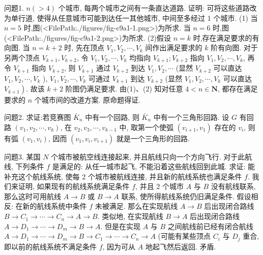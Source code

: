 
问题1. $n(>4)$ 个城市, 每两个城市之间有一条直达道路.
证明: 可将这些道路改为单行道, 使得从任意城市可能到达任一其他城市, 中间至多经过 1 个城市.
(1) 当 $n=5$ 时,图(<FilePath:./figures/fig-c9a1-1.png>)为所求.
当 $n=6$ 时,图(<FilePath:./figures/fig-c9a1-2.png>)为所求.
(2)假设 $n=k$ 时,存在满足要求的有向图.
当 $n=k+2$ 时, 先在顶点 $V_1, V_2, \cdots, V_k$ 间作出满足要求的 $k$ 阶有向图.
对于另两个顶点 $V_{k+1}, V_{k+2}$, 令 $V_1, V_2, \cdots, V_k$ 均指向 $V_{k+1} ; V_{k+2}$ 指向 $V_1, V_2, \cdots, V_k$, 再令 $V_{k+1}$ 指向 $V_{k+2}$, 则 $V_{k+1}$ 通过 $V_{k+2}$ 到达 $V_1, V_2, \cdots$ (显然 $V_{k+2}$ 可以直达 $V_1, V_2, \cdots, V_k$ ), $V_1, V_2, \cdots, V_k$ 可通过 $V_{k+1}$ 到达 $V_{k+2}$ (显然 $V_1, V_2, \cdots, V_k$ 可以直达 $\left.V_{k+1}\right)$. 故该 $k+2$ 阶图仍满足要求.
由(1)、(2) 知对任意 $4<n \in \mathbf{N}$, 都存在满足要求的 $n$ 个城市间的改道方案.
原命题得证.



问题2. 求证:若竞赛图 $\bar{K}_n$ 中有一个回路, 则 $\bar{K}_n$ 中有一个三角形回路.
设 $G$ 有回路 $\left(v_1, v_2, \cdots, v_k\right)$, 在 $v_2, v_3, \cdots, v_{k-1}$ 中, 取第一个使弧 $\left(v_{i+1}, v_1\right)$ 存在的 $v_i$, 则有弧 $\left(v_1, v_i\right)$, 因而 $\left(v_1, v_i, v_{i+1}\right)$ 就是一个三角形的回路.



问题3. 某国 $N$ 个城市被航空线连接起来, 并且航线只向一个方向飞行.
对于此航线, 下列条件 $f$ 是满足的: 从任一城市起飞, 不能沿着这些航线回到此城.
求证: 能补充这个航线系统, 使每 2 个城市被航线连接, 并且新的航线系统也满足条件 $f$.
我们来证明, 如果现有的航线系统满足条件 $f$, 并且 2 个城市 $A$ 与 $B$ 没有航线联系, 那么这时可用航线 $A \rightarrow B$ 或 $B \rightarrow A$ 联系, 使所得航线系统仍旧满足条件.
假设相反: 在新的航线系统中条件 $f$ 未被满足.
那么在实现航线 $A \rightarrow B$ 后出现闭合路线 $B \rightarrow C_1 \rightarrow \cdots \rightarrow C_n \rightarrow A \rightarrow B$. 类似地, 在实现航线 $B \rightarrow A$ 后出现闭合路线 $A \rightarrow D_1 \rightarrow \cdots \rightarrow D_m \rightarrow B \rightarrow A$. 但是在实现 $A$ 与 $B$ 之间航线前已经有闭合航线 $A \rightarrow D_1 \rightarrow \cdots \rightarrow D_m \rightarrow B \rightarrow C_1 \rightarrow \cdots \rightarrow C_n \rightarrow A$ (可能有某些顶点 $C_i$ 与 $D_j$ 重合, 即以前的航线系统不满足条件 $f$, 因为可从 $A$ 地起飞然后返回.
矛盾.




